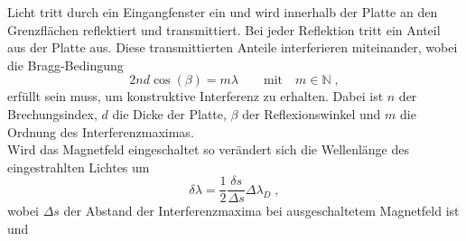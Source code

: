         Licht tritt durch ein Eingangfenster ein und wird innerhalb der Platte an den Grenzflächen reflektiert und transmittiert.
        Bei jeder Reflektion tritt ein Anteil aus der Platte aus.
        Diese transmittierten Anteile interferieren miteinander, wobei die Bragg-Bedingung
        \begin{equation}
            2 n d \cos(\beta) = m \lambda \qquad \text{mit} \quad m \in \mathbb{N} \;,
        \end{equation}
        erfüllt sein muss, um konstruktive Interferenz zu erhalten.
        Dabei ist $n$ der Brechungsindex, $d$ die Dicke der Platte, $\beta$ der Reflexionswinkel und $m$ die Ordnung des Interferenzmaximas.
        \\
        Wird das Magnetfeld eingeschaltet so verändert sich die Wellenlänge des eingestrahlten Lichtes um
        \begin{equation}
            \delta \lambda = \frac{1}{2} \frac{\delta s}{\Delta s} \Delta \lambda_D \;,
        \end{equation}
        wobei $\Delta s$ der Abstand der Interferenzmaxima bei ausgeschaltetem Magnetfeld ist und 